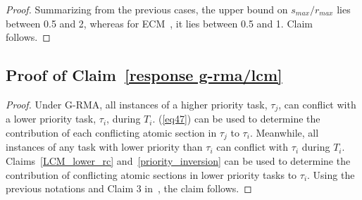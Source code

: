 \documentclass{sig-alternate}
\begin{document}
\begin{proof}
Summarizing from the previous cases, the upper bound on $s_{max}/r_{max}$
lies between 0.5 and 2, whereas for ECM~\cite{stmconcurrencycontrol:emsoft11},
it lies between 0.5 and 1. Claim follows.

\end{proof}
\subsection{\label{proof_response g-rma/lcm}Proof of Claim~\ref{response g-rma/lcm}}
\begin{proof}
Under G-RMA, all instances of a higher priority task, $\tau_{j}$, can conflict with a lower priority task,
$\tau_{i}$, during $T_{i}$. (\ref{eq47}) can be used to determine the contribution of each conflicting atomic section in $\tau_j$ to $\tau_i$. Meanwhile, all instances of any task with lower priority than $\tau_{i}$ can conflict with $\tau_i$ during $T_{i}$. Claims~\ref{LCM_lower_rc} and~\ref{priority_inversion} can be used to determine the contribution of conflicting atomic sections in lower priority tasks to $\tau_i$.
%
Using the previous notations and Claim 3 in~\cite{stmconcurrencycontrol:emsoft11}, the claim follows.
\end{proof}
\end{document}
